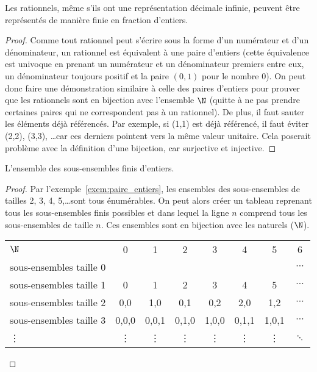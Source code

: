 \begin{myexem}
\begin{myexem}
 Les rationnels, même s'ils ont une représentation décimale infinie, peuvent être représentés de manière finie en fraction d'entiers.
	 \begin{proof}
	 	 Comme tout rationnel peut s'écrire sous la forme d'un numérateur et d'un dénominateur, un rationnel est équivalent à une paire d'entiers (cette équivalence est univoque en prenant un numérateur et un dénominateur premiers entre eux, un dénominateur toujours positif et la paire $(0,1)$ pour le nombre $0$). On peut donc faire une démonstration similaire à celle des paires d'entiers pour prouver que les rationnels sont en bijection avec l'ensemble $\N$ (quitte à ne pas prendre certaines paires qui ne correspondent pas à un rationnel). De plus, il faut sauter les éléments déjà référencés. Par exemple, si (1,1) est déjà référencé, il faut éviter (2,2), (3,3), \ldots car ces derniers pointent vers la même valeur unitaire. Cela poserait problème avec la définition d'une bijection, car surjective et injective.
	 \end{proof}
 \end{myexem}

\begin{myexem}
  L'ensemble des sous-ensembles finis d'entiers.
  \begin{proof}
  Par l'exemple~\ref{exem:paire_entiers}, les ensembles des sous-ensembles de tailles 2, 3, 4, 5,\dots sont tous énumérables. On peut alors créer un tableau reprenant tous les sous-ensembles finis possibles et dans lequel la ligne $n$ comprend tous les sous-ensembles de taille $n$. Ces ensembles sont en bijection avec les naturels ($\N$).

    \begin{tabular}{ l c c  c  c c c  c }
 	 $\N$ & 0 & 1 & 2  & 3 & 4 & 5 & 6  \\
 	 sous-ensembles  taille 0  & {} & {} & {} & {} & {} & {}  & $\cdots$ \\
 	 sous-ensembles  taille 1  & {0} & {1} & {2} & {3} & {4} & {5} & $\cdots$ \\
 	 sous-ensembles  taille 2  & {0,0} & {1,0} & {0,1} & {0,2} & {2,0} & {1,2}  & $\cdots$ \\
 	 sous-ensembles  taille 3  & {0,0,0} & {0,0,1} & {0,1,0} & {1,0,0} & {0,1,1} & {1,0,1}  & $\cdots$ \\
 	 \vdots  & {\vdots} & {\vdots} & {\vdots} & {\vdots} & {\vdots} & {\vdots}  & $\ddots$ \\
	\end{tabular}
  \end{proof}
\end{myexem}


\end{myexem}
